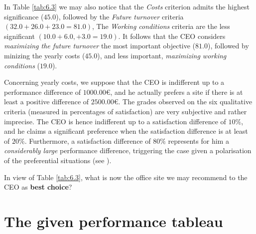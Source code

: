 In Table \ref{tab:6.3} we may also notice that the \emph{Costs} criterion admits the highest significance ($45.0$), followed by the \emph{Future turnover} criteria $(32.0 + 26.0 + 23.0 = 81.0)$, The \emph{Working conditions} criteria are the less significant $(10.0 + 6.0, + 3.0 = 19.0)$. It follows that the CEO considers \emph{maximizing the future turnover} the most important objective ($81.0$), followed by minizing the yearly costs ($45.0$), and less important, \emph{maximizing working conditions} ($19.0$). 

Concerning yearly costs, we suppose that the CEO is indifferent up to a performance difference of $1000.00$€, and he actually prefers a site if there is at least a positive difference of $2500.00$€. The grades observed on the six qualitative criteria (measured in percentages of satisfaction) are very subjective and rather imprecise. The CEO is hence indifferent up to a satisfaction difference of $10\%$, and he claims a significant preference when the satisfaction difference is at least of $20\%$.  Furthermore, a satisfaction difference of $80\%$ represents for him a \emph{considerably large} performance difference, triggering the case given a polarisation of the preferential situations (see \citet{BIS-2013}). 

In view of Table \ref{tab:6.3}, what is now the office site we may recommend to the CEO as \textbf{best choice}?

\section{The given performance tableau}
\label{sec:6.2}


